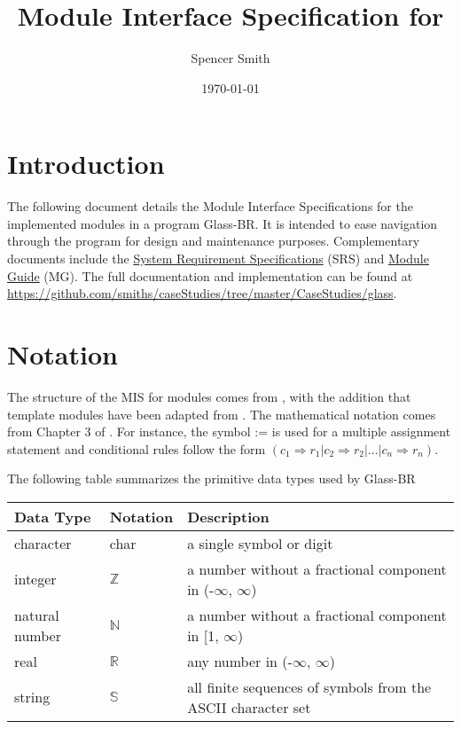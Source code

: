 \documentclass[12pt, titlepage]{article}
\newcommand{\progname}[1]{Glass-BR}
\begin{document}
\title{Module Interface Specification for \progname} 
\author{Spencer Smith}
\date{\today}

\maketitle

\tableofcontents

\newpage

\section{Introduction}

The following document details the Module Interface Specifications for the
implemented modules in a program \progname{}. It is intended to ease navigation
through the program for design and maintenance purposes.  Complementary
documents include the \href{../SRS/glassbr_srs.pdf}{System Requirement
  Specifications} (SRS) and \href{../MG/glassbr_mg.pdf}{Module Guide} (MG).  The
full documentation and implementation can be found at
\url{https://github.com/smiths/caseStudies/tree/master/CaseStudies/glass}.

\section{Notation}

The structure of the MIS for modules comes from \citet{HoffmanAndStrooper1995},
with the addition that template modules have been adapted from
\cite{GhezziEtAl2003}.  The mathematical notation comes from Chapter 3 of
\citet{HoffmanAndStrooper1995}.  For instance, the symbol := is used for a
multiple assignment statement and conditional rules follow the form $(c_1
\Rightarrow r_1 | c_2 \Rightarrow r_2 | ... | c_n \Rightarrow r_n )$.

The following table summarizes the primitive data types used by \progname. 

\begin{center}
\renewcommand{\arraystretch}{1.2}
\noindent 
\begin{tabular}{l l p{7.5cm}} 
\toprule 
\textbf{Data Type} & \textbf{Notation} & \textbf{Description}\\ 
\midrule
character & char & a single symbol or digit\\
integer & $\mathbb{Z}$ & a number without a fractional component in (-$\infty$, $\infty$) \\
natural number & $\mathbb{N}$ & a number without a fractional component in [1, $\infty$) \\
real & $\mathbb{R}$ & any number in (-$\infty$, $\infty$)\\
string & $\mathbb{S}$ & all finite sequences of symbols from the ASCII character set\\
\bottomrule
\end{tabular} 
\end{center}
\end{document}
